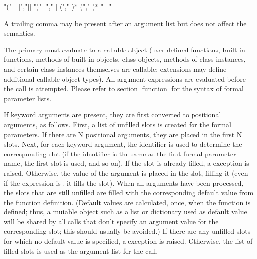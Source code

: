 \begin{productionlist}
             { "(" [ [","]] ")"}
             { ["," ]}
             { ("," )*}
             { ("," )*}
             { "=" }
\end{productionlist}

A trailing comma may be present after an argument list but does not
affect the semantics.

The primary must evaluate to a callable object (user-defined
functions, built-in functions, methods of built-in objects, class
objects, methods of class instances, and certain class instances
themselves are callable; extensions may define additional callable
object types).  All argument expressions are evaluated before the call
is attempted.  Please refer to section \ref{function} for the syntax
of formal parameter lists.

If keyword arguments are present, they are first converted to
positional arguments, as follows.  First, a list of unfilled slots is
created for the formal parameters.  If there are N positional
arguments, they are placed in the first N slots.  Next, for each
keyword argument, the identifier is used to determine the
corresponding slot (if the identifier is the same as the first formal
parameter name, the first slot is used, and so on).  If the slot is
already filled, a  exception is raised.
Otherwise, the value of the argument is placed in the slot, filling it
(even if the expression is , it fills the slot).  When all
arguments have been processed, the slots that are still unfilled are
filled with the corresponding default value from the function
definition.  (Default values are calculated, once, when the function
is defined; thus, a mutable object such as a list or dictionary used
as default value will be shared by all calls that don't specify an
argument value for the corresponding slot; this should usually be
avoided.)  If there are any unfilled slots for which no default value
is specified, a  exception is raised.  Otherwise,
the list of filled slots is used as the argument list for the call.

